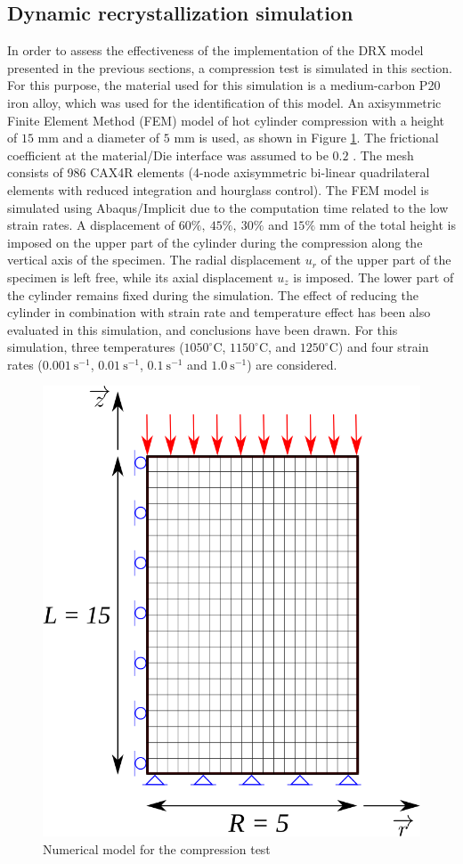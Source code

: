 \documentclass[metals,article,submit,pdftex,moreauthors]{Definitions/mdpi}
\begin{document}
\subsection{Dynamic recrystallization simulation\label{subsec:DRXSimulation}}
In order to assess the effectiveness of the implementation of the DRX model presented in the previous sections, a compression test is simulated in this section.
For this purpose, the material used for this simulation is a medium-carbon P20 iron alloy, which was used for the identification of this model.
An axisymmetric Finite Element Method (FEM) model of hot cylinder compression with a height of $15$ mm and a diameter of $5$ mm is used, as shown in Figure \ref{fig:Mesh}.
The frictional coefficient at the material/Die interface was assumed to be $0.2$ \cite{zhang2019elevated,sun2020kinetique}.
The mesh consists of 986 CAX4R elements (4-node axisymmetric bi-linear quadrilateral elements with reduced integration and hourglass control).
The FEM model is simulated using Abaqus/Implicit due to the computation time related to the low strain rates.
A displacement of $60\%, ~45\%, ~30\%$ and $15\%$ mm of the total height is imposed on the upper part of the cylinder during the compression along the vertical axis of the specimen.
The radial displacement $u_r$ of the upper part of the specimen is left free, while its axial displacement $u_z$ is imposed.
The lower part of the cylinder remains fixed during the simulation.
The effect of reducing the cylinder in combination with strain rate and temperature effect has been also evaluated in this simulation, and conclusions have been drawn.
For this simulation, three temperatures ($1050^\circ$C, $1150^\circ$C, and $1250^\circ$C) and four strain rates ($0.001~\text{s}^{-1}$, $0.01~\text{s}^{-1}$, $0.1~\text{s}^{-1}$ and $1.0~\text{s}^{-1}$) are considered.
\begin{figure}[H]
\includegraphics[width=0.6\columnwidth]{Figures/CyCompression2}
\caption{Numerical model for the compression test}
\label{fig:Mesh}
\end{figure}
\end{document}
